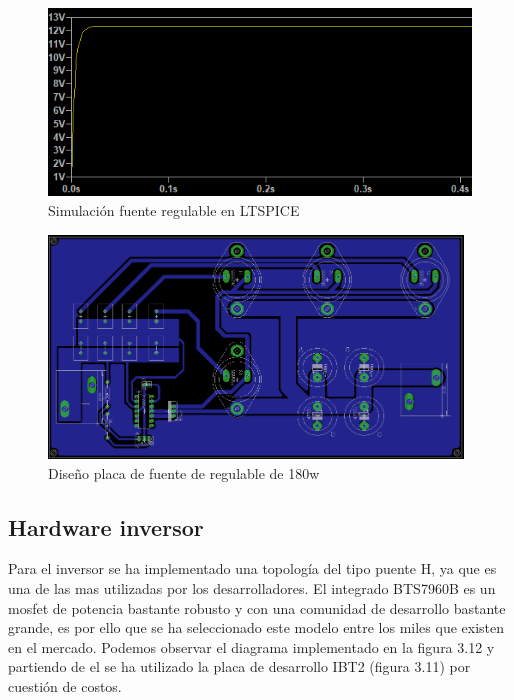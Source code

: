 \begin{figure}[H]
\centering
\includegraphics[width=12cm]{Capitulo3/figs/12v.png}
\caption{Simulación fuente regulable en LTSPICE}
\end{figure}

\begin{figure}[H]
\centering
\includegraphics[width=11cm]{Capitulo3/figs/pcb.png}
\caption{Diseño placa de fuente de regulable de 180w}
\end{figure}





\newpage

\subsection{Hardware inversor}

Para el inversor se ha implementado una topología del tipo puente H, ya que es una de las mas utilizadas por los desarrolladores. El integrado BTS7960B \cite{databts} es un mosfet de potencia bastante robusto y con una comunidad de desarrollo bastante grande, es por ello que se ha seleccionado este modelo entre los miles que existen en el mercado. Podemos observar el diagrama implementado en la figura 3.12 \cite{ibt} y partiendo de el se ha utilizado la placa de desarrollo IBT2 (figura 3.11) por cuestión de costos. \\

